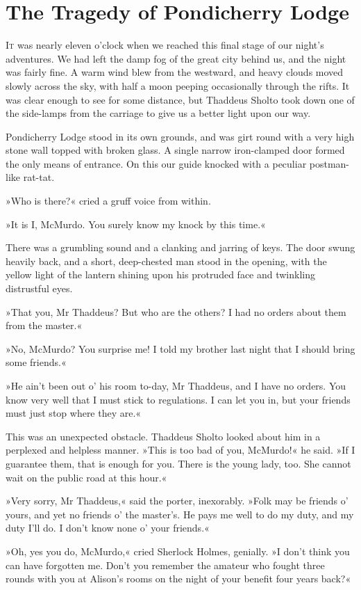 \chapter{The Tragedy of Pondicherry Lodge}
\lettrine[lines=4]{I}{t} was nearly eleven o'clock when we reached this final stage of our night's adventures. We had left the damp fog of the great city behind us, and the night was fairly fine. A warm wind blew from the westward, and heavy clouds moved slowly across the sky, with half a moon peeping occasionally through the rifts. It was clear enough to see for some distance, but Thaddeus Sholto took down one of the side-lamps from the carriage to give us a better light upon our way.

Pondicherry Lodge stood in its own grounds, and was girt round with a very high stone wall topped with broken glass. A single narrow iron-clamped door formed the only means of entrance. On this our guide knocked with a peculiar postman-like rat-tat.

»Who is there?« cried a gruff voice from within.

»It is I, McMurdo. You surely know my knock by this time.«

There was a grumbling sound and a clanking and jarring of keys. The door swung heavily back, and a short, deep-chested man stood in the opening, with the yellow light of the lantern shining upon his protruded face and twinkling distrustful eyes.

»That you, Mr Thaddeus? But who are the others? I had no orders about them from the master.«

»No, McMurdo? You surprise me! I told my brother last night that I should bring some friends.«

»He ain't been out o' his room to-day, Mr Thaddeus, and I have no orders. You know very well that I must stick to regulations. I can let you in, but your friends must just stop where they are.«

This was an unexpected obstacle. Thaddeus Sholto looked about him in a perplexed and helpless manner. »This is too bad of you, McMurdo!« he said. »If I guarantee them, that is enough for you. There is the young lady, too. She cannot wait on the public road at this hour.«

»Very sorry, Mr Thaddeus,« said the porter, inexorably. »Folk may be friends o' yours, and yet no friends o' the master's. He pays me well to do my duty, and my duty I'll do. I don't know none o' your friends.«

»Oh, yes you do, McMurdo,« cried Sherlock Holmes, genially. »I don't think you can have forgotten me. Don't you remember the amateur who fought three rounds with you at Alison's rooms on the night of your benefit four years back?«

